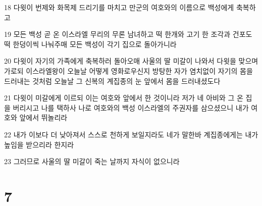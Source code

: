 \par 18 다윗이 번제와 화목제 드리기를 마치고 만군의 여호와의 이름으로 백성에게 축복하고
\par 19 모든 백성 곧 온 이스라엘 무리의 무론 남녀하고 떡 한개와 고기 한 조각과 건포도떡 한덩이씩 나눠주매 모든 백성이 각기 집으로 돌아가니라
\par 20 다윗이 자기의 가족에게 축복하러 돌아오매 사울의 딸 미갈이 나와서 다윗을 맞으며 가로되 이스라엘왕이 오늘날 어떻게 영화로우신지 방탕한 자가 염치없이 자기의 몸을 드러내는 것처럼 오늘날 그 신복의 계집종의 눈 앞에서 몸을 드러내셨도다
\par 21 다윗이 미갈에게 이르되 이는 여호와 앞에서 한 것이니라 저가 네 아비와 그 온 집을 버리시고 나를 택하사 나로 여호와의 백성 이스라엘의 주권자를 삼으셨으니 내가 여호와 앞에서 뛰놀리라
\par 22 내가 이보다 더 낮아져서 스스로 천하게 보일지라도 네가 말한바 계집종에게는 내가 높임을 받으리라 한지라
\par 23 그러므로 사울의 딸 미갈이 죽는 날까지 자식이 없으니라

\chapter{7}

